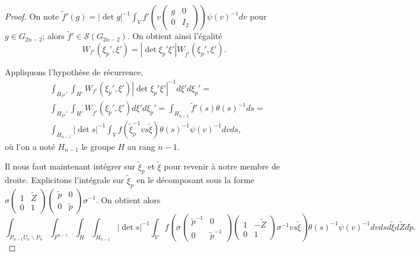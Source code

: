 \documentclass{amsart}
\begin{document}
\begin{proof}
On note $\tilde{f}'(g) = |\det g|^{-1}\int_V f'\left(v\begin{pmatrix}
g & 0 \\
0 & I_2
\end{pmatrix}\right) \psi(v)^{-1} dv$ pour $g \in G_{2n-2}$; alors $\tilde{f}' \in \mathcal{S}(G_{2n-2})$. On obtient ainsi l'égalité
\begin{equation}
W_{f'}(\xi_p', \xi') = |\det \xi_p' \xi'| W_{\tilde{f}'}(\xi_p', \xi').
\end{equation}

Appliquons l'hypothèse de récurrence,
 \begin{equation}
 \begin{split}
 & \int_{H_{P'}'} \int_{H'} W_{f'}(\xi_p', \xi') |\det \xi_p'\xi'|^{-1} d\xi' d\xi_p' = \\
 & \int_{H_{P'}'} \int_{H'} W_{\tilde{f}'}(\xi_p', \xi') d\xi' d\xi_p' = \int_{H_{n-1}} \tilde{f}'(s) \theta(s)^{-1} ds = \\
 & \int_{H_{n-1}} |\det s|^{-1} \int_V f(\tilde{\xi}_p^{-1}v s \tilde{\xi}) \theta(s)^{-1} \psi(v)^{-1} dv ds,
 \end{split}
 \end{equation}
où l'on a noté $H_{n-1}$ le groupe $H$ au rang $n-1$.

Il nous faut maintenant intégrer sur $\tilde{\xi}_p$ et $\tilde{\xi}$ pour revenir à notre membre de droite. Explicitons l'intégrale sur $\tilde{\xi}_p$ en le décomposant sous la forme $\sigma \begin{pmatrix}
1 & \tilde{Z} \\
0 & 1
\end{pmatrix}\begin{pmatrix}
\tilde{p} & 0 \\
0 & \tilde{p}
\end{pmatrix} \sigma^{-1}$. On obtient alors
\begin{equation}
\int_{P_{n-1}U_n\backslash{P_n}} \int_{F^{n-1}} \int_{\tilde{H}} \int_{H_{n-1}} |\det s|^{-1} \int_V f\left(\sigma \begin{pmatrix}
\tilde{p}^{-1} & 0 \\
0 & \tilde{p}^{-1}
\end{pmatrix} \begin{pmatrix}
1 & -\tilde{Z} \\
0 & 1
\end{pmatrix} \sigma^{-1} v s \tilde{\xi}\right) \theta(s)^{-1} \psi(v)^{-1} dv ds d\tilde{\xi} d\tilde{Z} d\tilde{p}.
\end{equation}


\end{proof}
\end{document}
